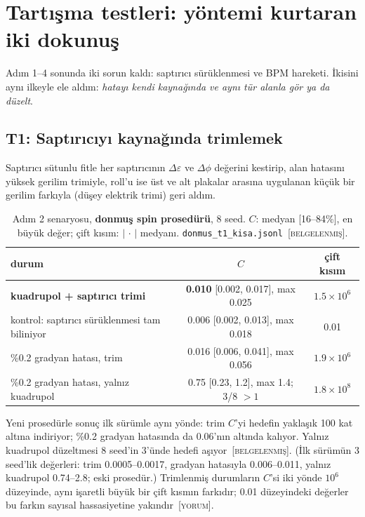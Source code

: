 \documentclass[11pt,a4paper]{article}
\newcommand{\kod}[1]{{\XeTeXinterchartokenstate=0\texttt{#1}}}
\newcommand{\BEL}{\textsc{[belgelenmiş]}}
\newcommand{\YOR}{\textsc{[yorum]}}
\begin{document}
\section{Tartışma testleri: yöntemi kurtaran iki dokunuş}

Adım 1--4 sonunda iki sorun kaldı: saptırıcı sürüklenmesi ve BPM hareketi. İkisini aynı ilkeyle ele aldım:
\emph{hatayı kendi kaynağında ve aynı tür alanla gör ya da düzelt}.

\subsection{T1: Saptırıcıyı kaynağında trimlemek}\label{sec:T1}
Saptırıcı sütunlu fitle her saptırıcının $\Delta\varepsilon$ ve $\Delta\phi$ değerini kestirip, alan
hatasını yüksek gerilim trimiyle, roll'u ise üst ve alt plakalar arasına uygulanan küçük bir gerilim farkıyla
(düşey elektrik trimi) geri aldım.

\begin{table}[H]\centering\small
\caption{Adım 2 senaryosu, \textbf{donmuş spin prosedürü}, 8 seed. $C$: medyan [16--84\%], en büyük
değer; çift kısım: $|\,\cdot\,|$ medyanı. \kod{donmus\_t1\_kisa.jsonl}~\BEL.}
\footnotesize
\begin{tabular}{lcc}
\toprule
durum & $C$ & çift kısım \\
\midrule
\textbf{kuadrupol + saptırıcı trimi} & \textbf{0.010} [0.002, 0.017], max 0.025 & $1.5\times10^{6}$ \\
kontrol: saptırıcı sürüklenmesi tam biliniyor & 0.006 [0.002, 0.013], max 0.018 & 0.01 \\
\%0.2 gradyan hatası, trim & 0.016 [0.006, 0.041], max 0.056 & $1.9\times10^{6}$ \\
\%0.2 gradyan hatası, yalnız kuadrupol & 0.75 [0.23, 1.2], max 1.4; 3/8 $>1$ & $1.8\times10^{8}$ \\
\bottomrule
\end{tabular}
\end{table}

Yeni prosedürle sonuç ilk sürümle aynı yönde: trim $C$'yi hedefin yaklaşık 100 kat altına indiriyor;
\%0.2 gradyan hatasında da 0.06'nın altında kalıyor. Yalnız kuadrupol düzeltmesi 8 seed'in 3'ünde hedefi
aşıyor~\BEL. (İlk sürümün 3 seed'lik değerleri: trim 0.0005--0.0017, gradyan hatasıyla 0.006--0.011, yalnız
kuadrupol 0.74--2.8; eski prosedür.) Trimlenmiş durumların $C$'si iki yönde $10^{6}$ düzeyinde, aynı
işaretli büyük bir çift kısmın farkıdır; 0.01 düzeyindeki değerler bu farkın sayısal hassasiyetine
yakındır~\YOR.
\end{document}
